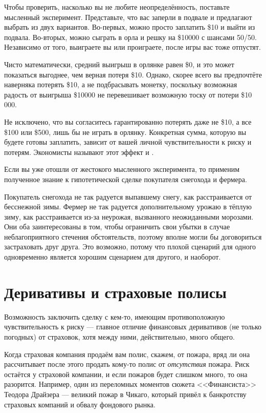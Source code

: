 Чтобы проверить, насколько вы не любите неопределённость, поставьте мысленный эксперимент. Представьте, что вас заперли в подвале и предлагают выбрать из двух вариантов. Во-первых, можно просто заплатить \$10 и выйти из подвала. Во-вторых, можно сыграть в орла и решку на \$\num{10000} с шансами 50/50. Независимо от того, выиграете вы или проиграете, после игры вас тоже отпустят. 

Чисто математически, средний выигрыш в орлянке равен \$0, и это может показаться выгоднее, чем верная потеря \$10. Однако, скорее всего вы предпочтёте наверняка потерять \$10, а не подбрасывать монетку, поскольку возможная радость от выигрыша \$\num{10 000} не перевешивает возможную тоску от потери \${10 000}.

Не исключено, что вы согласитесь гарантированно потерять даже не \$10, а все \$100 или \$500, лишь бы не играть в орлянку. Конкретная сумма, которую вы будете готовы заплатить, зависит от вашей личной чувствительности к риску и потерям. Экономисты называют этот эффект  и .

Если вы уже отошли от жестокого мысленного эксперимента, то применим полученное знание к гипотетической сделке покупателя снегохода и фермера.

Покупатель снегохода не так радуется выпавшему снегу, как расстраивается от бесснежной зимы. Фермер не так радуется дополнительному урожаю в тёплую зиму, как расстраивается из-за неурожая, вызванного неожиданными морозами. Они оба заинтересованы в том, чтобы ограничить свои убытки в случае неблагоприятного стечения обстоятельств, поэтому вполне могли бы договориться застраховать друг друга. Это возможно, потому что плохой сценарий для одного одновременно является хорошим сценарием для другого, и наоборот.

\section*{Деривативы и страховые полисы}

Возможность заключить сделку с кем-то, имеющим противоположную чувствительность к риску --- главное отличие финансовых деривативов (не только погодных) от страховок,
хотя между ними, действительно, много общего.

Когда страховая компания продаём вам
полис, скажем, от пожара, вряд ли она рассчитывает после этого продать кому-то полис от
\emph{отсутствия} пожара. Риск остаётся у страховой компании, и если пожаров будет
слишком много, то она разорится. Например, один из переломных моментов сюжета <<Финансиста>>
Теодора Драйзера --- великий пожар в Чикаго, который привёл к банкротству страховых
компаний и обвалу фондового рынка.


